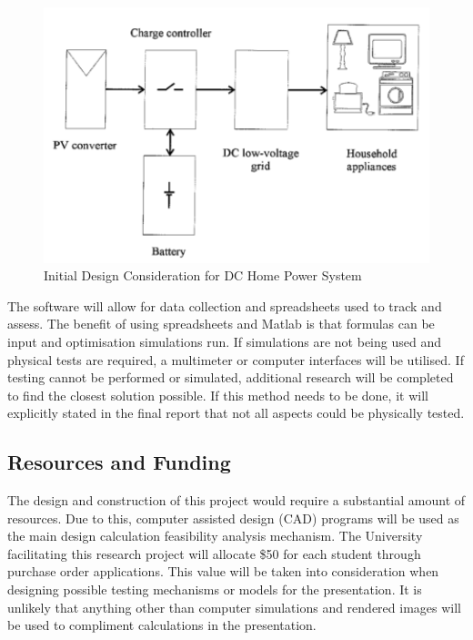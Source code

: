 \begin{figure}[H]
\hfill\includegraphics[width = 120mm]{images/DC_Home}\hspace*{\fill}
\caption{Initial Design Consideration for DC Home Power System \cite{Pellis1997}} 
\label{fig:DCHomeSystem}
\end{figure} 

The software will allow for data collection and spreadsheets used to track and assess. The benefit of using spreadsheets and Matlab is that formulas can be input and optimisation simulations run. If simulations are not being used and physical tests are required, a multimeter or computer interfaces will be utilised. If testing cannot be performed or simulated, additional research will be completed to find the closest solution possible. If this method needs to be done, it will explicitly stated in the final report that not all aspects could be physically tested.     

\newpage

\subsection{Resources and Funding}

The design and construction of this project would require a substantial amount of resources. Due to this, computer assisted design (CAD) programs will be used as the main design calculation feasibility analysis mechanism. The University facilitating this research project will allocate \$50 for each student through purchase order applications. This value will be taken into consideration when designing possible testing mechanisms or models for the presentation. It is unlikely that anything other than computer simulations and rendered images will be used to compliment calculations in the presentation.  

